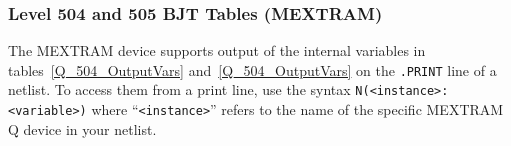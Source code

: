 \subsubsection{Level 504 and 505 BJT Tables (MEXTRAM)}


The MEXTRAM device supports output of the internal variables in
tables~\ref{Q_504_OutputVars} and~\ref{Q_504_OutputVars} on the \texttt{.PRINT} line of a netlist.
To access them from a print line, use the syntax
\texttt{N(<instance>:<variable>)} where ``\texttt{<instance>}'' refers to the
name of the specific MEXTRAM Q device in your netlist.




\clearpage




\clearpage

